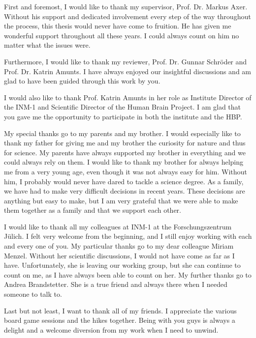 \label{sec:acknowledgement}
% 
First and foremost, I would like to thank my supervisor, Prof. Dr. Markus Axer.
Without his support and dedicated involvement every step of the way throughout the process, this thesis would never have come to fruition. 
He has given me wonderful support throughout all these years.
I could always count on him no matter what the issues were.

Furthermore, I would like to thank my reviewer, Prof. Dr. Gunnar Schr{\"o}der and Prof. Dr. Katrin Amunts.
I have always enjoyed our insightful discussions and am glad to have been guided through this work by you. 

I would also like to thank Prof. Katrin Amunts in her role as Institute Director of the INM-1 and Scientific Director of the Human Brain Project.
I am glad that you gave me the opportunity to participate in both the institute and the HBP.

My special thanks go to my parents and my brother.
I would especially like to thank my father for giving me and my brother the curiosity for nature and thus for science.
My parents have always supported my brother in everything and we could always rely on them.
I would like to thank my brother for always helping me from a very young age, even though it was not always easy for him.
Without him, I probably would never have dared to tackle a science degree.
As a family, we have had to make very difficult decisions in recent years.
These decisions are anything but easy to make, but I am very grateful that we were able to make them together as a family and that we support each other.

I would like to thank all my colleagues at INM-1 at the Forschungszentrum J{\"u}lich.
I felt very welcome from the beginning, and I still enjoy working with each and every one of you.
My particular thanks go to my dear colleague Miriam Menzel.
Without her scientific discussions, I would not have come as far as I have.
Unfortunately, she is leaving our working group, but she can continue to count on me, as I have always been able to count on her.
My further thanks go to Andrea Brandstetter.
She is a true friend and always there when I needed someone to talk to.

Last but not least, I want to thank all of my friends.
I appreciate the various board game sessions and the hikes together.
Being with you guys is always a delight and a welcome diversion from my work when I need to unwind. 